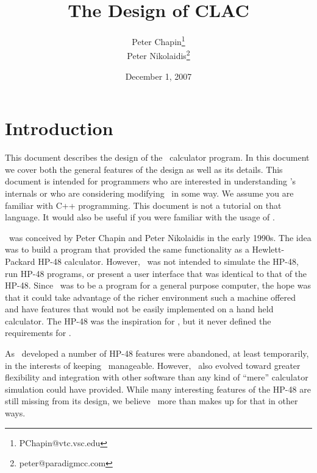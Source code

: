 \documentclass{report}
\begin{document}
\title{The Design of CLAC}
\author{Peter Chapin\thanks{PChapin@vtc.vsc.edu}\\
        Peter Nikolaidis\thanks{peter@paradigmcc.com}}
\date{December 1, 2007}
\maketitle

\tableofcontents
\newpage
{}

\chapter{Introduction}

This document describes the design of the \CLAC\ calculator program. In this document we cover
both the general features of the design as well as its details. This document is intended for
programmers who are interested in understanding \CLAC's internals or who are considering
modifying \CLAC\ in some way. We assume you are familiar with C++ programming. This document is
not a tutorial on that language. It would also be useful if you were familiar with the usage of
\CLAC.

\CLAC\ was conceived by Peter Chapin and Peter Nikolaidis in the early 1990s. The idea was to
build a program that provided the same functionality as a Hewlett-Packard HP-48 calculator.
However, \CLAC\ was not intended to simulate the HP-48, run HP-48 programs, or present a user
interface that was identical to that of the HP-48. Since \CLAC\ was to be a program for a
general purpose computer, the hope was that it could take advantage of the richer environment
such a machine offered and have features that would not be easily implemented on a hand held
calculator. The HP-48 was the inspiration for \CLAC, but it never defined the requirements for
\CLAC.

As \CLAC\ developed a number of HP-48 features were abandoned, at least temporarily, in the
interests of keeping \CLAC\ manageable. However, \CLAC\ also evolved toward greater flexibility
and integration with other software than any kind of ``mere'' calculator simulation could have
provided. While many interesting features of the HP-48 are still missing from its design, we
believe \CLAC\ more than makes up for that in other ways.
\end{document}
